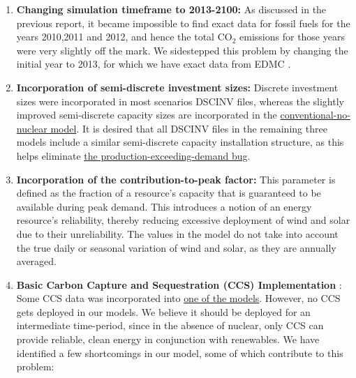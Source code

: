 \documentclass[14pt,a4paper]{article} %
\begin{document}
\begin{enumerate}
\item \textbf{Changing simulation timeframe to 2013-2100:} As discussed in the previous report, it became impossible to find exact data for fossil fuels for the years 2010,2011 and 2012, and hence the total CO$_2$ emissions for those years were very slightly off the mark. We sidestepped this problem by changing the initial year to 2013, for which we have exact data from EDMC \cite{noauthor_energy_2018}.

\item \textbf{Incorporation of semi-discrete investment sizes:} Discrete investment sizes were incorporated in most scenarios DSCINV files, whereas the slightly improved semi-discrete capacity sizes are incorporated in the \href{https://github.com/arfc/i2cner/tree/master/JPN-Main-Model/active/co2-constrnt-conv-nonuc}{conventional-no-nuclear model}. It is desired that all DSCINV files in the remaining three models include a similar semi-discrete capacity installation structure, as this helps eliminate \href{https://github.com/arfc/i2cner/issues/74}{the production-exceeding-demand bug}.\\

\item \textbf{Incorporation of the contribution-to-peak \cite{gargiulo_documentation_2005} factor:} This parameter is defined as the fraction of a resource's capacity that is guaranteed to be available during peak demand. This introduces a notion of an energy resource's reliability, thereby reducing excessive deployment of wind and solar due to their unreliability. The values in the model \cite{kato_energy_2016} do not take into account the true daily or seasonal variation of wind and solar, as they are annually averaged.\\

\item \textbf{Basic Carbon Capture and Sequestration (CCS) Implementation} : Some CCS data \cite{kato_energy_2016}  was incorporated into \href{https://github.com/arfc/i2cner/tree/master/JPN-Main-Model/active/i2cner-nonuc}{one of the models}. However, no CCS gets deployed in our models. We believe  it should be deployed for an intermediate time-period, since in the absence of nuclear, only CCS can provide reliable, clean energy in conjunction with renewables. We have identified a few shortcomings in our model, some of which contribute to this problem:

\begin{itemize}


\end{itemize}
\end{enumerate}
\end{document}
